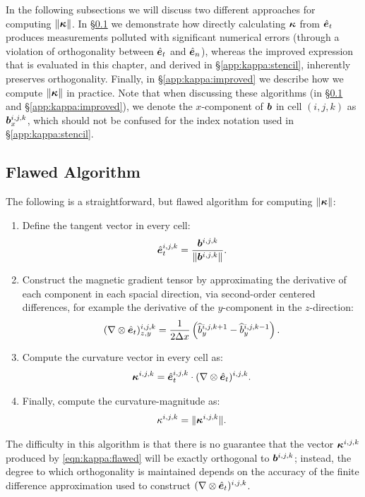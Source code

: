 In the following subsections we will discuss two different approaches for computing $\|\bm{\kappa}\|$. In \S\ref{app:kappa:flawed} we demonstrate how directly calculating $\bm{\kappa}$ from $\hat{\bm{e}}_{t}$ produces measurements polluted with significant numerical errors (through a violation of orthogonality between $\hat{\bm{e}}_{t}$ and $\hat{\bm{e}}_{n}$), whereas the improved expression that is evaluated in this chapter, and derived in \S\ref{app:kappa:stencil}, inherently preserves orthogonality. Finally, in \S\ref{app:kappa:improved} we describe how we compute $\|\bm{\kappa}\|$ in practice. Note that when discussing these algorithms (in \S\ref{app:kappa:flawed} and \S\ref{app:kappa:improved}), we denote the $x$-component of $\bm{b}$ in cell $(i,j,k)$ as $\bm{b}_x^{i,j,k}$, which should not be confused for the index notation used in \S\ref{app:kappa:stencil}.

\subsection{Flawed Algorithm}
\label{app:kappa:flawed}

The following is a straightforward, but flawed algorithm for computing $\|\bm{\kappa}\|$:
\begin{enumerate}
    \item Define the tangent vector in every cell:
        \begin{align}
            \hat{\bm{e}}_{t}^{i,j,k}
                = \frac{\bm{b}^{i,j,k}}{\|\bm{b}^{i,j,k}\|} .
        \end{align}
    \item Construct the magnetic gradient tensor by approximating the derivative of each component in each spacial direction, via second-order centered differences, for example the derivative of the $y$-component in the $z$-direction:
        \begin{align}
            (\nabla\otimes\hat{\bm{e}}_{t})^{i,j,k}_{z,y}
                = \frac{1}{2\Delta x} \left( \widehat{b}^{i,j,k+1}_y - \widehat{b}^{i,j,k-1}_y \right) .
        \end{align}
    \item Compute the curvature vector in every cell as:
        \begin{align}
            \bm{\kappa}^{i,j,k}
                = \hat{\bm{e}}_{t}^{i,j,k} \cdot (\nabla\otimes\hat{\bm{e}}_{t})^{i,j,k}
                . \label{eqn:kappa:flawed}
        \end{align}
    \item Finally, compute the curvature-magnitude as:
        \begin{align}
            \kappa^{i,j,k}
                = \|\bm{\kappa}^{i,j,k}\| .
        \end{align}
\end{enumerate}
The difficulty in this algorithm is that there is no guarantee that the vector $\bm{\kappa}^{i,j,k}$ produced by \autoref{eqn:kappa:flawed} will be exactly orthogonal to $\bm{b}^{i,j,k}$; instead, the degree to which orthogonality is maintained depends on the accuracy of the finite difference approximation used to construct $(\nabla\otimes\hat{\bm{e}}_{t})^{i,j,k}$.

